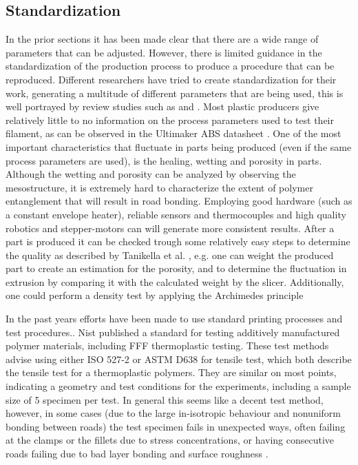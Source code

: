 \subsection{Standardization}
    \label{Standarization}
In the prior sections it has been made clear that there are a wide range of parameters that can be adjusted. However, there is limited guidance in the standardization of the production process to produce a procedure that can be reproduced. Different researchers have tried to create standardization for their work, generating a multitude of different parameters that are being used, this is well portrayed by review studies such as \cite{Peterson2019ReviewPerspective} and \cite{Popescu2018FDMReview}.  Most plastic producers give relatively little to no information on the process parameters used to test their filament, as can be observed in the Ultimaker ABS datasheet \cite{Ultimaker2018TechnicalABS}. One of the most important characteristics that fluctuate in parts being produced (even if the same process parameters are used), is the healing, wetting and porosity in parts. Although the wetting and porosity can be analyzed by observing the mesostructure, it is extremely hard to characterize the extent of polymer entanglement that will result in road bonding. Employing good hardware (such as a constant envelope heater), reliable sensors and thermocouples and high quality robotics and stepper-motors can will generate more consistent results. After a part is produced it can be checked trough some relatively easy steps to determine the quality as described by Tanikella et al. \cite{Tanikella2017TensilePrinting}, e.g. one can weight the produced part to create an estimation for the porosity, and to determine the fluctuation in extrusion by comparing it with the calculated weight by the slicer. Additionally, one could perform a density test by applying the Archimedes principle

In the past years efforts have been made to use standard printing processes and test procedures.. Nist \cite{Forster2015NISTApplicability} published a standard for testing additively manufactured polymer materials, including FFF thermoplastic testing. These test methods advise using either ISO 527-2 \cite{Afd2016NEN-EN-ISO527-2} or ASTM D638 \cite{Materials2015ASTMD638-14} for tensile test, which both describe the tensile test for a thermoplastic polymers. They are similar on most points, indicating a geometry and test conditions for the experiments, including a sample size of 5 specimen per test. In general this seems like a decent test method, however, in some cases (due to the large in-isotropic behaviour and nonuniform bonding between roads) the test specimen fails in unexpected ways, often failing at the clamps or the fillets due to stress concentrations\cite{Alaimo2017InfluenceParts}, or having consecutive roads failing due to bad layer bonding and surface roughness \cite{Ahn2002AnisotropicABS} \cite{Bertoldi1998MechanicalDeposition}. 

